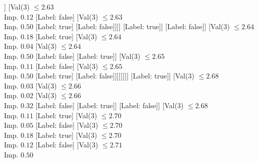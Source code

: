 \documentclass[margin=10pt]{standalone}
\begin{document}
\begin{forest}
																			[Val($3$) $ \leq 2.63$ \\ Imp. $0.07$
																				[Val($3$) $ \leq 2.63$ \\ Imp. $0.11$
																					[Val($3$) $ \leq 2.63$ \\ Imp. $0.04$
																						[Val($3$) $ \leq 2.63$ \\ Imp. $0.50$
																							[Label: false]
																							[Label: true]]
																						[Val($3$) $ \leq 2.63$ \\ Imp. $0.12$
																							[Label: false]
																							[Val($3$) $ \leq 2.63$ \\ Imp. $0.50$
																								[Label: true]
																								[Label: false]]]]
																					[Label: true]]
																				[Label: false]]
																			[Val($3$) $ \leq 2.64$ \\ Imp. $0.18$
																				[Label: true]
																				[Val($3$) $ \leq 2.64$ \\ Imp. $0.04$
																					[Val($3$) $ \leq 2.64$ \\ Imp. $0.50$
																						[Label: false]
																						[Label: true]]
																					[Val($3$) $ \leq 2.65$ \\ Imp. $0.11$
																						[Label: false]
																						[Val($3$) $ \leq 2.65$ \\ Imp. $0.50$
																							[Label: true]
																							[Label: false]]]]]]]]
																[Label: true]]
															[Val($3$) $ \leq 2.68$ \\ Imp. $0.03$
																[Val($3$) $ \leq 2.66$ \\ Imp. $0.02$
																	[Val($3$) $ \leq 2.66$ \\ Imp. $0.32$
																		[Label: false]
																		[Label: true]]
																	[Label: false]]
																[Val($3$) $ \leq 2.68$ \\ Imp. $0.11$
																	[Label: true]
																	[Val($3$) $ \leq 2.70$ \\ Imp. $0.05$
																		[Label: false]
																		[Val($3$) $ \leq 2.70$ \\ Imp. $0.18$
																			[Label: true]
																			[Val($3$) $ \leq 2.70$ \\ Imp. $0.12$
																				[Label: false]
																				[Val($3$) $ \leq 2.71$ \\ Imp. $0.50$

\end{forest}
\end{document}
